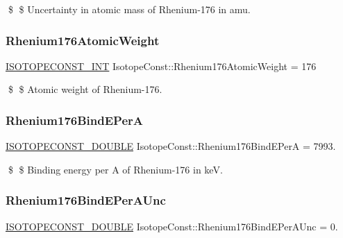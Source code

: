 \$ \$ Uncertainty in atomic mass of Rhenium-\/176 in amu. \mbox{\label{group___isotope_const-_rhenium-_re176_gaad3041fb600f8ca5fc34bb2564c7dce3}} 
\subsubsection{\texorpdfstring{Rhenium176\+Atomic\+Weight}{Rhenium176AtomicWeight}}
{\footnotesize\ttfamily \mbox{\hyperlink{group___isotope_const-_macros_ga5f18360b3e99483a35c32d789e62621c}{I\+S\+O\+T\+O\+P\+E\+C\+O\+N\+S\+T\+\_\+\+I\+NT}} Isotope\+Const\+::\+Rhenium176\+Atomic\+Weight = 176}

\$ \$ Atomic weight of Rhenium-\/176. \mbox{\label{group___isotope_const-_rhenium-_re176_ga843d531daeef007f81e1f7c2f5a99b0e}} 
\subsubsection{\texorpdfstring{Rhenium176\+Bind\+E\+PerA}{Rhenium176BindEPerA}}
{\footnotesize\ttfamily \mbox{\hyperlink{group___isotope_const-_macros_ga8f45a7272ce02c0b4c65c44636ed719a}{I\+S\+O\+T\+O\+P\+E\+C\+O\+N\+S\+T\+\_\+\+D\+O\+U\+B\+LE}} Isotope\+Const\+::\+Rhenium176\+Bind\+E\+PerA = 7993.}

\$ \$ Binding energy per A of Rhenium-\/176 in keV. \mbox{\label{group___isotope_const-_rhenium-_re176_gad83ae4b17dc64f02c3763d9c3210d851}} 
\subsubsection{\texorpdfstring{Rhenium176\+Bind\+E\+Per\+A\+Unc}{Rhenium176BindEPerAUnc}}
{\footnotesize\ttfamily \mbox{\hyperlink{group___isotope_const-_macros_ga8f45a7272ce02c0b4c65c44636ed719a}{I\+S\+O\+T\+O\+P\+E\+C\+O\+N\+S\+T\+\_\+\+D\+O\+U\+B\+LE}} Isotope\+Const\+::\+Rhenium176\+Bind\+E\+Per\+A\+Unc = 0.}

